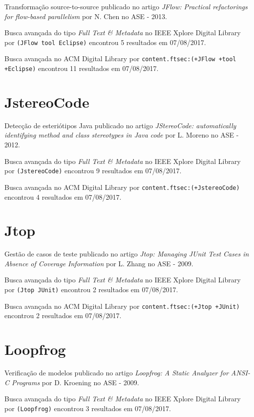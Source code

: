 Transformação source-to-source
publicado no artigo
{\it JFlow: Practical refactorings for flow-based parallelism}
por
N. Chen
no
ASE
-
2013.

Busca avançada do tipo {\it Full Text \& Metadata} no IEEE Xplore Digital Library por
\texttt{(JFlow tool Eclipse)}
encontrou
5 resultados em
07/08/2017.

Busca avançada no ACM Digital Library por
\texttt{content.ftsec:(+JFlow +tool +Eclipse)}
encontrou
11 resultados em
07/08/2017.

\section{JstereoCode}

Detecção de esteriótipos Java
publicado no artigo
{\it JStereoCode: automatically identifying method and class stereotypes in Java code}
por
L. Moreno
no
ASE
-
2012.

Busca avançada do tipo {\it Full Text \& Metadata} no IEEE Xplore Digital Library por
\texttt{(JstereoCode)}
encontrou
9 resultados em
07/08/2017.

Busca avançada no ACM Digital Library por
\texttt{content.ftsec:(+JstereoCode)}
encontrou
4 resultados em
07/08/2017.

\section{Jtop}

Gestão de casos de teste
publicado no artigo
{\it Jtop: Managing JUnit Test Cases in Absence of Coverage Information}
por
L. Zhang
no
ASE
-
2009.

Busca avançada do tipo {\it Full Text \& Metadata} no IEEE Xplore Digital Library por
\texttt{(Jtop JUnit)}
encontrou
2 resultados em
07/08/2017.

Busca avançada no ACM Digital Library por
\texttt{content.ftsec:(+Jtop +JUnit)}
encontrou
2 resultados em
07/08/2017.

\section{Loopfrog}

Verificação de modelos
publicado no artigo
{\it Loopfrog: A Static Analyzer for ANSI-C Programs}
por
D. Kroening
no
ASE
-
2009.

Busca avançada do tipo {\it Full Text \& Metadata} no IEEE Xplore Digital Library por
\texttt{(Loopfrog)}
encontrou
3 resultados em
07/08/2017.

